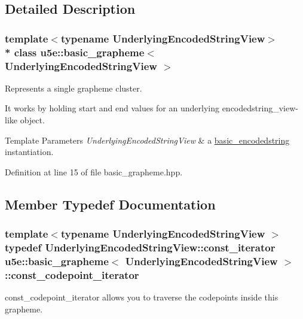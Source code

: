 \subsection{Detailed Description}
\subsubsection*{template$<$typename Underlying\+Encoded\+String\+View$>$\\*
class u5e\+::basic\+\_\+grapheme$<$ Underlying\+Encoded\+String\+View $>$}

Represents a single grapheme cluster. 

It works by holding start and end values for an underlying encodedstring\+\_\+view-\/like object.


\begin{DoxyTemplParams}{Template Parameters}
{\em Underlying\+Encoded\+String\+View} & a \hyperlink{classu5e_1_1basic__encodedstring}{basic\+\_\+encodedstring} instantiation. \\
\hline
\end{DoxyTemplParams}


Definition at line 15 of file basic\+\_\+grapheme.\+hpp.



\subsection{Member Typedef Documentation}
\subsubsection[{\texorpdfstring{const\+\_\+codepoint\+\_\+iterator}{const_codepoint_iterator}}]{\setlength{\rightskip}{0pt plus 5cm}template$<$typename Underlying\+Encoded\+String\+View $>$ typedef Underlying\+Encoded\+String\+View\+::const\+\_\+iterator {\bf u5e\+::basic\+\_\+grapheme}$<$ Underlying\+Encoded\+String\+View $>$\+::{\bf const\+\_\+codepoint\+\_\+iterator}}\hypertarget{classu5e_1_1basic__grapheme_ad2ae62d95df689316cd516736c0a3b92}{}\label{classu5e_1_1basic__grapheme_ad2ae62d95df689316cd516736c0a3b92}
const\+\_\+codepoint\+\_\+iterator allows you to traverse the codepoints inside this grapheme. 

